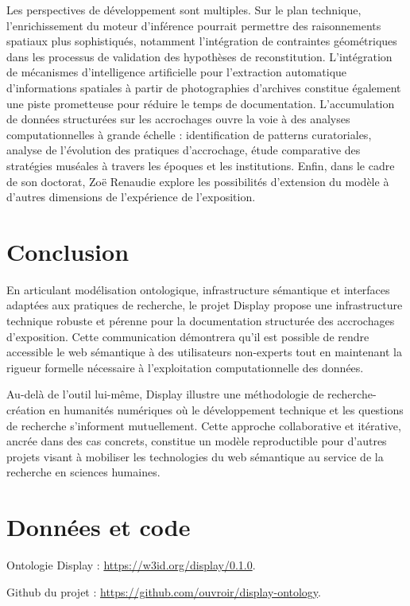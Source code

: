 \documentclass[fra, final]{anthology-ch}         %
\begin{document}
Les perspectives de développement sont multiples. Sur le plan technique, l’enrichissement du moteur d’inférence pourrait permettre des raisonnements spatiaux plus sophistiqués, notamment l’intégration de contraintes géométriques dans les processus de validation des hypothèses de reconstitution. L’intégration de mécanismes d’intelligence artificielle pour l’extraction automatique d’informations spatiales à partir de photographies d’archives constitue également une piste prometteuse pour réduire le temps de documentation. L’accumulation de données structurées sur les accrochages ouvre la voie à des analyses computationnelles à grande échelle : identification de patterns curatoriales, analyse de l’évolution des pratiques d’accrochage, étude comparative des stratégies muséales à travers les époques et les institutions. Enfin, dans le cadre de son doctorat, Zoë Renaudie explore les possibilités d’extension du modèle à d’autres dimensions de l’expérience de l’exposition. 

\section{Conclusion}

En articulant modélisation ontologique, infrastructure sémantique et interfaces adaptées aux pratiques de recherche, le projet Display propose une infrastructure technique robuste et pérenne pour la documentation structurée des accrochages d’exposition. Cette communication démontrera qu’il est possible de rendre accessible le web sémantique à des utilisateurs non-experts tout en maintenant la rigueur formelle nécessaire à l’exploitation computationnelle des données.

Au-delà de l’outil lui-même, Display illustre une méthodologie de recherche-création en humanités numériques où le développement technique et les questions de recherche s’informent mutuellement. Cette approche collaborative et itérative, ancrée dans des cas concrets, constitue un modèle reproductible pour d’autres projets visant à mobiliser les technologies du web sémantique au service de la recherche en sciences humaines.

\section*{Données et code}

Ontologie Display : \url{https://w3id.org/display/0.1.0}.

\noindent Github du projet : \url{https://github.com/ouvroir/display-ontology}.
\end{document}
